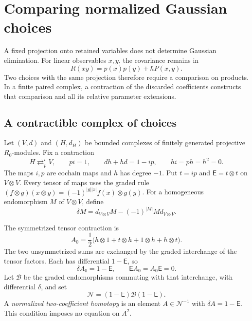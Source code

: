 \section{Comparing normalized Gaussian choices}
\label{sec:vol2-gaussian-choices}

A fixed projection onto retained variables does not determine
Gaussian elimination. For linear observables $x,y$, the
covariance remains in
\[
 R(xy)=p(x)p(y)+\hbar P(x,y).
\]
Two choices with the same projection therefore require a
comparison on products. In a finite paired complex, a
contraction of the discarded coefficients constructs that
comparison and all its relative parameter extensions.

\subsection{A contractible complex of choices}

Let $(V,d)$ and $(H,d_H)$ be bounded complexes of finitely
generated projective $R_0$-modules. Fix a contraction
\[
 H\mathrel{\mathop{\rightleftarrows}^{i}_{p}}V,
 \qquad pi=1,\qquad dh+hd=1-ip,
 \qquad hi=ph=h^2=0.
\]
The maps $i,p$ are cochain maps and $h$ has degree $-1$.
Put $t=ip$ and $\mathsf E=t\otimes t$ on $V\otimes V$.
Every tensor of maps uses the graded rule
$(f\otimes g)(x\otimes y)=(-1)^{|g||x|}f(x)\otimes g(y)$.
For a homogeneous endomorphism $M$ of $V\otimes V$, define
\[
 \delta M=d_{V\otimes V}M-(-1)^{|M|}Md_{V\otimes V}.
\]

The symmetrized tensor contraction is
\begin{equation}\label{eq:vol2-reference-two-coefficients}
 A_0=\frac12\bigl(h\otimes1+t\otimes h
                         +1\otimes h+h\otimes t\bigr).
\end{equation}
The two unsymmetrized sums are exchanged by the graded
interchange of the tensor factors. Each has differential
$1-\mathsf E$, so
\begin{equation}\label{eq:vol2-normalized-two-coefficients}
 \delta A_0=1-\mathsf E,
 \qquad \mathsf EA_0=A_0\mathsf E=0.
\end{equation}
Let $\mathcal B$ be the graded endomorphisms commuting
with that interchange, with differential $\delta$, and set
\[
 \mathcal N=(1-\mathsf E)\mathcal B(1-\mathsf E).
\]
A \emph{normalized two-coefficient homotopy} is an element
$A\in\mathcal N^{-1}$ with $\delta A=1-\mathsf E$.
This condition imposes no equation on $A^2$.

